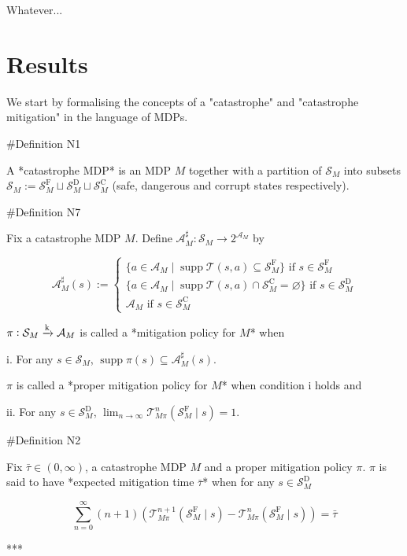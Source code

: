 \documentclass[a4paper]{article}
\newcommand{\Comment}[1]{}
\DeclareMathOperator{\Supp}{supp}
\newcommand{\AP}[1]{\left(#1\right)}
\newcommand{\Nats}{\mathbb{N}}
\newcommand{\M}{\xrightarrow{\textnormal{k}}}
\newcommand{\A}{\mathcal{A}}
\newcommand{\St}{\mathcal{S}}
\newcommand{\T}{\mathcal{T}}
\newcommand{\RMC}{\mathrm{C}}
\newcommand{\RMD}{\mathrm{D}}
\newcommand{\RMF}{\mathrm{F}}
\newcommand{\SF}{\St^{\RMF}}
\newcommand{\SD}{\St^{\RMD}}
\newcommand{\SC}{\St^{\RMC}}
\begin{document}
Whatever...

\section{Results}

We start by formalising the concepts of a "catastrophe" and "catastrophe mitigation" in the language of MDPs.

\#Definition N1

A *catastrophe MDP* is an MDP $M$ together with a partition of $\St_M$ into subsets $\St_M:=\SF_M \sqcup \SD_M \sqcup \SC_M$ (safe, dangerous and corrupt states respectively).

\#Definition N7

Fix a catastrophe MDP $M$. Define $\A_M^\sharp: \St_M \rightarrow 2^{\A_M}$ by

$$\A_M^\sharp(s):=\begin{cases} \{a \in \A_M \mid \Supp{\T(s,a)} \subseteq \SF_M\} \text{ if } s \in \SF_M \\ \{a \in \A_M \mid \Supp{\T(s,a)} \cap \SC_M = \varnothing\} \text{ if } s \in \SD_M \\ \A_M \text{ if } s \in \SC_M \end{cases}$$

$\pi: \St_M \M \A_M$ is called a *mitigation policy for $M$* when 

i. For any $s \in \St_M$, $\Supp{\pi(s)} \subseteq \A_M^\sharp(s)$. 

$\pi$ is called a *proper mitigation policy for $M$* when condition i holds and

ii. For any $s \in \SD_M$, $\lim_{n \rightarrow \infty} \T_{M\pi}^n\AP{\SF_M \mid s} = 1$. 

\Comment{Given $k \in \Nats$, $\pi$ is called a *proper k-mitigation policy for $M$* when conditions i+ii hold and

iii. For any $s \in \St_D$, $\Supp{\pi(s)} \subseteq \A_M^k(s)$.

iv. For any $s \in \St_F$, $\Supp{\pi(s)} \subseteq \A_M^{k+1}(s)$.}

\#Definition N2

Fix $\bar{\tau} \in (0,\infty)$, a catastrophe MDP $M$ and a proper mitigation policy $\pi$. $\pi$ is said to have *expected mitigation time $\bar{\tau}$* when for any $s \in \SD_M$

$$\sum_{n=0}^\infty (n+1) \AP{\T_{M\pi}^{n+1}\AP{\SF_M \mid s}-\T_{M\pi}^{n}\AP{\SF_M \mid s}} = \bar{\tau}$$

***
\end{document}
